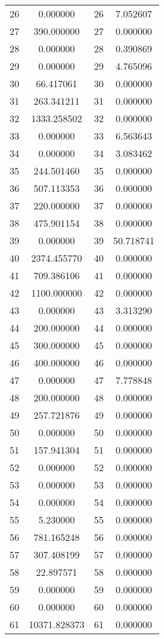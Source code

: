 \documentclass[12pt]{article}
\begin{document}
\begin{longtable}{@{}cccc@{}}
26 & 0.000000 & 26 & 7.052607 \\
27 & 390.000000 & 27 & 0.000000 \\
28 & 0.000000 & 28 & 0.390869 \\
29 & 0.000000 & 29 & 4.765096 \\
30 & 66.417061 & 30 & 0.000000 \\
31 & 263.341211 & 31 & 0.000000 \\
32 & 1333.258502 & 32 & 0.000000 \\
33 & 0.000000 & 33 & 6.563643 \\
34 & 0.000000 & 34 & 3.083462 \\
35 & 244.501460 & 35 & 0.000000 \\
36 & 507.113353 & 36 & 0.000000 \\
37 & 220.000000 & 37 & 0.000000 \\
38 & 475.901154 & 38 & 0.000000 \\
39 & 0.000000 & 39 & 50.718741 \\
40 & 2374.455770 & 40 & 0.000000 \\
41 & 709.386106 & 41 & 0.000000 \\
42 & 1100.000000 & 42 & 0.000000 \\
43 & 0.000000 & 43 & 3.313290 \\
44 & 200.000000 & 44 & 0.000000 \\
45 & 300.000000 & 45 & 0.000000 \\
46 & 400.000000 & 46 & 0.000000 \\
47 & 0.000000 & 47 & 7.778848 \\
48 & 200.000000 & 48 & 0.000000 \\
49 & 257.721876 & 49 & 0.000000 \\
50 & 0.000000 & 50 & 0.000000 \\
51 & 157.941304 & 51 & 0.000000 \\
52 & 0.000000 & 52 & 0.000000 \\
53 & 0.000000 & 53 & 0.000000 \\
54 & 0.000000 & 54 & 0.000000 \\
55 & 5.230000 & 55 & 0.000000 \\
56 & 781.165248 & 56 & 0.000000 \\
57 & 307.408199 & 57 & 0.000000 \\
58 & 22.897571 & 58 & 0.000000 \\
59 & 0.000000 & 59 & 0.000000 \\
60 & 0.000000 & 60 & 0.000000 \\
61 & 10371.828373 & 61 & 0.000000 \\

\end{longtable}
\end{document}
